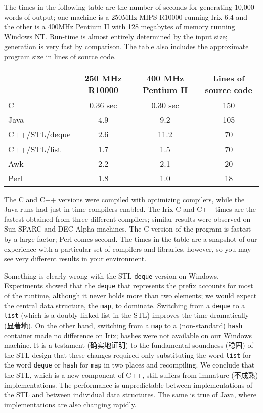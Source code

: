 The times in the following table are the number of seconds for generating
10,000 words of output; one machine is a 250MHz MIPS R10000 running Irix
6.4 and the other is a 400MHz Pentium II with 128 megabytes of memory
running Windows NT.  Run-time is almost entirely determined by the input
size; generation is very fast by comparison. The table also includes the
approximate program size in lines of source code. \\
\begin{center}
\begin{tabular}{l|ccc}
    & 250 MHz R10000    & 400 MHz Pentium II    & Lines of source code \\
    \hline
    C           & 0.36 sec  & 0.30 sec  & 150 \\
    Java        & 4.9       & 9.2       & 105 \\
    C++/STL/deque & 2.6     & 11.2      & 70  \\
    C++/STL/list & 1.7      & 1.5       & 70 \\
    Awk         & 2.2       & 2.1       & 20 \\
    Perl        & 1.8       & 1.0       & 18
\end{tabular}
\end{center}

The C and C++ versions were compiled with optimizing compilers, while the
Java runs had just-in-time compilers enabled. The Irix C and C++ times are
the fastest obtained from three different compilers; similar results were
observed on Sun SPARC and DEC Alpha machines. The C version of the program
is fastest by a large factor; Perl comes second. The times in the table are
a snapshot of our experience with a particular set of compilers and
libraries, however, so you may see very different results in your
environment.

Something is clearly wrong with the STL \verb'deque' version on Windows.
Experiments showed that the \verb'deque' that represents the prefix
accounts for most of the runtime, although it never holds more than two
elements; we would expect the central data structure, the \verb'map', to
dominate. Switching from a \verb'deque' to a \verb'list' (which is a
doubly-linked list in the STL) improves the time dramatically (显著地). On
the other hand, switching from a \verb'map' to a (non-standard) \verb'hash'
container made no difference on Irix; hashes were not available on our
Windows machine. It is a testament (确实地证明) to the fundamental
soundness (稳固) of the STL design that these changes required only
substituting the word \verb'list' for the word \verb'deque' or \verb'hash'
for \verb'map' in two places and recompiling. We conclude that the STL,
which is a new component of C++, still suffers from immature (不成熟)
implementations. The performance is unpredictable between implementations
of the STL and between individual data structures. The same is true of
Java, where implementations are also changing rapidly.

